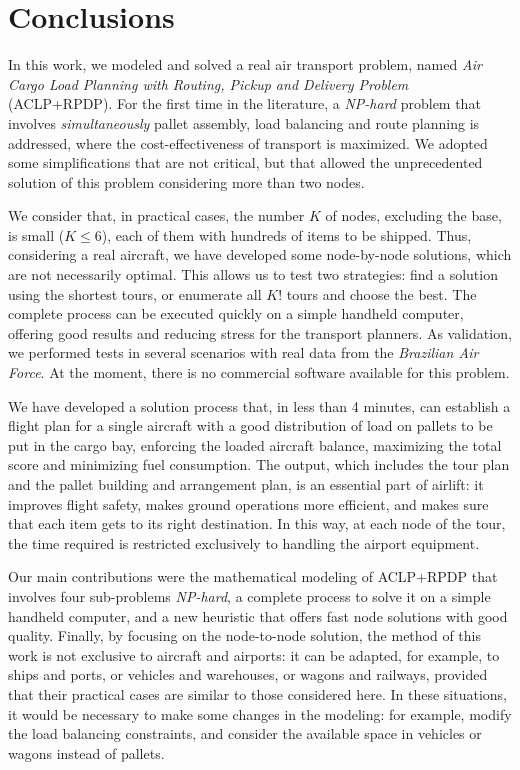 \documentclass[preprint]{elsarticle}
\begin{document}
\section{Conclusions}
\label{sec7}

In this work, we modeled and solved a real air transport problem, named {\it Air Cargo Load Planning with Routing, Pickup and Delivery Problem}\/ (ACLP+RPDP). For the first time in the literature, a {\it NP-hard}\/ problem that involves {\it simultaneously}\/ pallet assembly, load balancing and route planning is addressed, where the cost-effectiveness of transport is maximized. We adopted some simplifications that are not critical, but that allowed the unprecedented solution of this problem considering more than two nodes.

We consider that, in practical cases, the number $K$\/ of nodes, excluding the base, is small ($K \leq 6$), each of them with hundreds of items to be shipped. Thus, considering a real aircraft, we have developed some node-by-node solutions, which are not necessarily optimal. This allows us to test two strategies: find a solution using the shortest tours, or enumerate all $K!$\/ tours and choose the best. The complete process can be executed quickly on a simple handheld computer, offering good results and reducing stress for the transport planners. As validation, we performed tests in several scenarios with real data from the {\it Brazilian Air Force}. At the moment, there is no {\color{blue}commercial} software available for this problem.

We have developed a solution process that, in less than 4 minutes, can establish a flight plan for a single aircraft with a good distribution of load on pallets to be put in the cargo bay, enforcing the loaded aircraft balance, maximizing the total score and minimizing fuel consumption. The output, which includes the tour plan and the pallet building and arrangement plan, is an essential part of airlift: it improves flight safety, makes ground operations more efficient, and makes sure that each item gets to its right destination. In this way, at each node of the tour, the time required is restricted exclusively to handling the airport equipment.

Our main contributions were the mathematical modeling of ACLP+RPDP that involves four sub-problems {\it NP-hard}\/, a complete process to solve it on a simple handheld computer, and a new heuristic that offers fast node solutions with good quality. Finally, by focusing on the node-to-node solution, the method of this work is not exclusive to aircraft and airports: it can be adapted, for example, to ships and ports, or vehicles and warehouses, or wagons and railways, provided that their practical cases are similar to those considered here. In these situations, it would be necessary to make some changes in the modeling: for example, modify the load balancing constraints, and consider the available space in vehicles or wagons instead of pallets.
\end{document}
